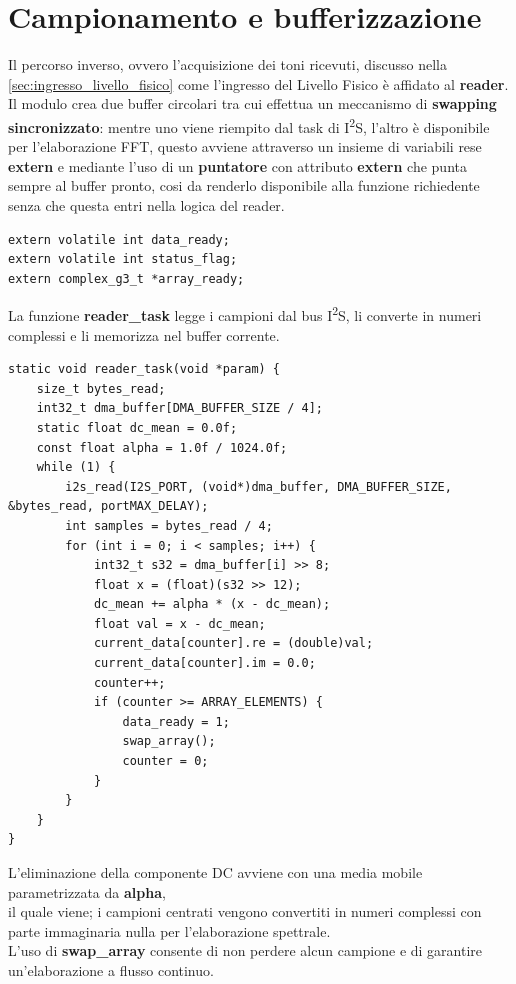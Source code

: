 \section{Campionamento e bufferizzazione}

Il percorso inverso, ovvero l’acquisizione dei toni ricevuti, discusso nella \autoref{sec:ingresso_livello_fisico} come l'ingresso del Livello Fisico 
è affidato al \textbf{reader}.  \\ 
Il modulo crea due buffer circolari tra cui effettua un meccanismo di \textbf{swapping sincronizzato}: mentre uno viene riempito dal task di I\textsuperscript{2}S, 
l’altro è disponibile per l’elaborazione FFT, questo avviene attraverso un insieme di variabili rese \textbf{extern} e mediante l'uso di un \textbf{puntatore} 
con attributo \textbf{extern} che punta sempre al buffer pronto, cosi da renderlo disponibile alla funzione richiedente senza che questa entri nella 
logica del reader. \\

\begin{verbatim}
extern volatile int data_ready;
extern volatile int status_flag;
extern complex_g3_t *array_ready;
\end{verbatim}

La funzione \textbf{reader\_task} legge i campioni dal bus I\textsuperscript{2}S, li converte in numeri complessi e li memorizza nel buffer corrente.\\

\begin{verbatim}
static void reader_task(void *param) {
    size_t bytes_read;
    int32_t dma_buffer[DMA_BUFFER_SIZE / 4];
    static float dc_mean = 0.0f;
    const float alpha = 1.0f / 1024.0f;
    while (1) {
        i2s_read(I2S_PORT, (void*)dma_buffer, DMA_BUFFER_SIZE, &bytes_read, portMAX_DELAY);
        int samples = bytes_read / 4;
        for (int i = 0; i < samples; i++) {
            int32_t s32 = dma_buffer[i] >> 8;
            float x = (float)(s32 >> 12);
            dc_mean += alpha * (x - dc_mean);
            float val = x - dc_mean;
            current_data[counter].re = (double)val;
            current_data[counter].im = 0.0;
            counter++;
            if (counter >= ARRAY_ELEMENTS) {
                data_ready = 1;
                swap_array();
                counter = 0;
            }
        }
    }
}
\end{verbatim}

L’eliminazione della componente DC avviene con una media mobile parametrizzata da \textbf{alpha}, \\ 
il quale viene; i campioni centrati vengono convertiti in numeri complessi con parte immaginaria nulla per l’elaborazione spettrale.\\
L’uso di \textbf{swap\_array} consente di non perdere alcun campione e di garantire un’elaborazione a flusso continuo.  \\

